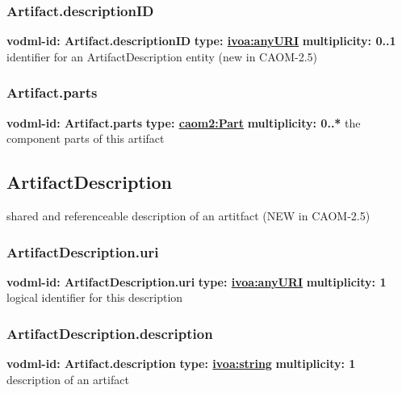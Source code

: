     \subsubsection{Artifact.descriptionID}
      \textbf{vodml-id: Artifact.descriptionID} \newline
      \textbf{type: \hyperref[sect:ivoa]{ivoa:anyURI}} \newline
      \textbf{multiplicity: 0..1} \newline
      identifier for an ArtifactDescription entity (new in CAOM-2.5)

    \subsubsection{Artifact.parts}
      \textbf{vodml-id: Artifact.parts} \newline
      \textbf{type: \hyperref[sect:Part]{caom2:Part}} \newline
      \textbf{multiplicity: 0..*} \newline
      the component parts of this artifact

  \subsection{ArtifactDescription}
  \label{sect:ArtifactDescription}
    shared and referenceable description of an artitfact (NEW in CAOM-2.5)

    \subsubsection{ArtifactDescription.uri}
      \textbf{vodml-id: ArtifactDescription.uri} \newline
      \textbf{type: \hyperref[sect:ivoa]{ivoa:anyURI}} \newline
      \textbf{multiplicity: 1} \newline
      logical identifier for this description

    \subsubsection{ArtifactDescription.description}
      \textbf{vodml-id: Artifact.description} \newline
      \textbf{type: \hyperref[sect:ivoa]{ivoa:string}} \newline
      \textbf{multiplicity: 1} \newline
      description of an artifact

